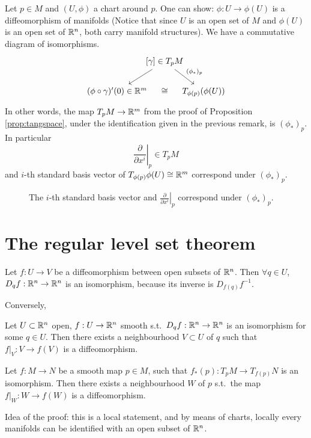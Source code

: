 \begin{remark}
Let $p\in M$ and $(U,\phi)$ a chart around $p$. One can show:    $\phi:U \to  \phi(U)$ is a diffeomorphism of manifolds (Notice that since $U$ is an open set of $M$ and $\phi(U)$ is an open set of $\mathbb{R}^n$, both carry manifold structures).
We have a commutative diagram of isomorphisms.
\[
    \begin{tikzcd}[column sep=-1em]
    & {[\gamma] \in T_pM} \arrow[dl] \arrow[dr, "{(\phi_*)_p}"]&\\
    {(\phi \circ  \gamma)'(0) \in  \R^{m}} &\cong& T_{\phi(p)} (\phi(U))
\end{tikzcd}
\] 
In other words, the map $T_p M \to  \mathbb{R}^{m}$ from the proof of Proposition \ref{prop:tangspace}, under the identification given in the previous remark, is $(\phi_*)_p$.
In particular
\[
\left.\frac{\partial}{\partial x^i} \right|_p \in T_pM
\] 
and $i$-th  standard basis vector of  $T_{\phi(p)} \phi(U) \cong \mathbb{R}^m$ correspond under $(\phi_*)_p$.


\begin{figure}[H]
    \centering
    \caption{The $i$-th  standard basis vector and $\left.\frac{\partial}{\partial x^i}\right|_p$ correspond under $(\phi_*)_p$.}
    \label{fig:figure-1}
\end{figure}
\end{remark}

\section{The regular level set theorem}
\begin{remark}
    Let $f: U \to  V$ be a diffeomorphism between open subsets of $\mathbb{R}^n$.
    Then $\forall q \in U$, $ D_q f: \mathbb{R}^n \to  \mathbb{R}^n $ is an isomorphism, because its inverse is $D_{f(q)} f^{-1}$.
\end{remark}
Conversely,
\begin{lemma}
    Let $U \subset \mathbb{R}^n$ open, $f: U \to  \mathbb{R}^n$ smooth s.t.\ $D_qf:\mathbb{R}^n \to  \mathbb{R}^n$ is an isomorphism for some $q \in U$.
    Then there exists a neighbourhood $V \subset U$ of $q$ such that $ f|_V : V \to  f(V) $ is a diffeomorphism.
\end{lemma}
\begin{corollary}
    Let $f: M \to  N$ be a smooth map $p \in M$, such that $f_*(p): T_pM \to  T_{f(p)}N$ is an isomorphism.
    Then there exists a neighbourhood $W$ of $p$ s.t.\ the map $f|_W: W \to  f(W)$ is a diffeomorphism.
\end{corollary}
Idea of the proof: this is a local statement, and by means of charts, locally every manifolds can be identified with an open subset of $\mathbb{R}^n$.

